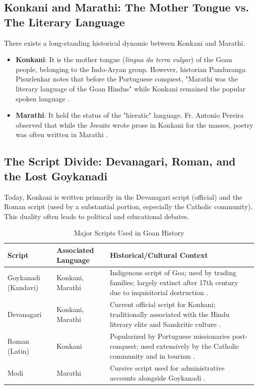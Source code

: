 \documentclass[12pt,a4paper]{article}
\begin{document}
\subsection{Konkani and Marathi: The Mother Tongue vs. The Literary Language}
There exists a long-standing historical dynamic between Konkani and Marathi.
\begin{itemize}
    \item \textbf{Konkani}: It is the mother tongue (\textit{lingua da terra vulgar}) of the Goan people, belonging to the Indo-Aryan group. However, historian Panduranga Pisurlenkar notes that before the Portuguese conquest, "Marathi was the literary language of the Goan Hindus" while Konkani remained the popular spoken language \cite{Faleiro2025}.
    \item \textbf{Marathi}: It held the status of the "hieratic" language. Fr. Antonio Pereira observed that while the Jesuits wrote prose in Konkani for the masses, poetry was often written in Marathi \cite{Faleiro2025}.
\end{itemize}

\subsection{The Script Divide: Devanagari, Roman, and the Lost Goykanadi}
Today, Konkani is written primarily in the Devanagari script (official) and the Roman script (used by a substantial portion, especially the Catholic community). This duality often leads to political and educational debates.

\begin{table}[h]
\centering
\begin{tabular}{|p{3cm}|p{4cm}|p{6cm}|}
\hline
\textbf{Script} & \textbf{Associated Language} & \textbf{Historical/Cultural Context} \\
\hline
Goykanadi (Kandavi) & Konkani, Marathi & Indigenous script of Goa; used by trading families; largely extinct after 17th century due to inquisitorial destruction \cite{Omniglot2023}. \\
\hline
Devanagari & Konkani, Marathi & Current official script for Konkani; traditionally associated with the Hindu literary elite and Sanskritic culture \cite{Faleiro2025}. \\
\hline
Roman (Latin) & Konkani & Popularized by Portuguese missionaries post-conquest; used extensively by the Catholic community and in tourism \cite{GoaTourism2025}. \\
\hline
Modi & Marathi & Cursive script used for administrative accounts alongside Goykanadi \cite{Omniglot2023}. \\
\hline
\end{tabular}
\caption{Major Scripts Used in Goan History}
\end{table}
\end{document}
